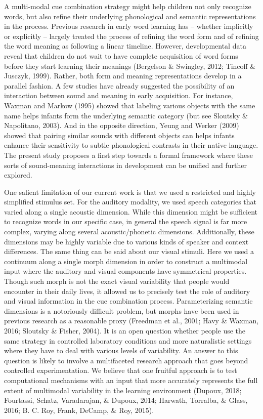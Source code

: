 \documentclass[english,floatsintext,man]{apa6}
\theoremstyle{definition}
\theoremstyle{definition}
\theoremstyle{definition}
\theoremstyle{remark}
\begin{document}
A multi-modal cue combination strategy might help children not only
recognize words, but also refine their underlying phonological and
semantic representations in the process. Previous research in early word
learning has -- whether implicitly or explicitly -- largely treated the
process of refining the word form and of refining the word meaning as
following a linear timeline. However, developmental data reveal that
children do not wait to have complete acquisition of word forms before
they start learning their meanings (Bergelson \& Swingley, 2012; Tincoff
\& Jusczyk, 1999). Rather, both form and meaning representations develop
in a parallel fashion. A few studies have already suggested the
possibility of an interaction between sound and meaning in early
acquisition. For instance, Waxman and Markow (1995) showed that labeling
various objects with the same name helps infants form the underlying
semantic category (but see Sloutsky \& Napolitano, 2003). And in the
opposite direction, Yeung and Werker (2009) showed that pairing similar
sounds with different objects can helps infants enhance their
sensitivity to subtle phonological contrasts in their native language.
The present study proposes a first step towards a formal framework where
these sorts of sound-meaning interactions in development can be unified
and further explored.

One salient limitation of our current work is that we used a restricted
and highly simplified stimulus set. For the auditory modality, we used
speech categories that varied along a single acoustic dimension. While
this dimension might be sufficient to recognize words in our specific
case, in general the speech signal is far more complex, varying along
several acoustic/phonetic dimensions. Additionally, these dimensions may
be highly variable due to various kinds of speaker and context
differences. The same thing can be said about our visual stimuli. Here
we used a continuum along a single morph dimension in order to construct
a multimodal input where the auditory and visual components have
symmetrical properties. Though such morph is not the exact visual
variability that people would encounter in their daily lives, it allowed
us to precisely test the role of auditory and visual information in the
cue combination process. Parameterizing semantic dimensions is a
notoriously difficult problem, but morphs have been used in previous
research as a reasonable proxy (Freedman et al., 2001; Havy \& Waxman,
2016; Sloutsky \& Fisher, 2004). It is an open question whether people
use the same strategy in controlled laboratory conditions and more
naturalistic settings where they have to deal with various levels of
variability. An answer to this question is likely to involve a
multifaceted research approach that goes beyond controlled
experimentation. We believe that one fruitful approach is to test
computational mechanisms with an input that more accurately represents
the full extent of multimodal variability in the learning environment
(Dupoux, 2018; Fourtassi, Schatz, Varadarajan, \& Dupoux, 2014; Harwath,
Torralba, \& Glass, 2016; B. C. Roy, Frank, DeCamp, \& Roy, 2015).
\end{document}
